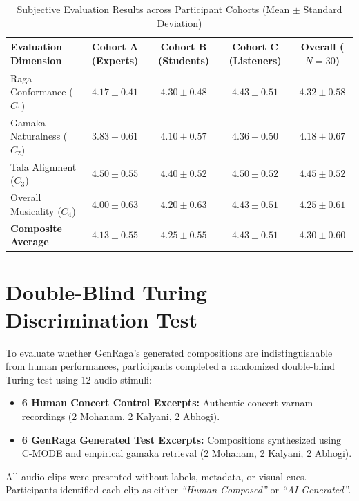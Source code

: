 \documentclass[11pt,a4paper]{article}
\begin{document}
\begin{table}[h!]
\centering
\caption{Subjective Evaluation Results across Participant Cohorts (Mean $\pm$ Standard Deviation)}
\label{tab:likert}
\vspace{0.5em}
\begin{tabular}{lcccc}
\toprule
\textbf{Evaluation Dimension} & \textbf{Cohort A (Experts)} & \textbf{Cohort B (Students)} & \textbf{Cohort C (Listeners)} & \textbf{Overall ($N=30$)} \\
\midrule
Raga Conformance ($C_1$) & $4.17 \pm 0.41$ & $4.30 \pm 0.48$ & $4.43 \pm 0.51$ & $\mathbf{4.32 \pm 0.58}$ \\
Gamaka Naturalness ($C_2$) & $3.83 \pm 0.61$ & $4.10 \pm 0.57$ & $4.36 \pm 0.50$ & $\mathbf{4.18 \pm 0.67}$ \\
Tala Alignment ($C_3$) & $4.50 \pm 0.55$ & $4.40 \pm 0.52$ & $4.50 \pm 0.52$ & $\mathbf{4.45 \pm 0.52}$ \\
Overall Musicality ($C_4$) & $4.00 \pm 0.63$ & $4.20 \pm 0.63$ & $4.43 \pm 0.51$ & $\mathbf{4.25 \pm 0.61}$ \\
\midrule
\textbf{Composite Average} & $\mathbf{4.13 \pm 0.55}$ & $\mathbf{4.25 \pm 0.55}$ & $\mathbf{4.43 \pm 0.51}$ & $\mathbf{4.30 \pm 0.60}$ \\
\bottomrule
\end{tabular}
\end{table}

\section{Double-Blind Turing Discrimination Test}

To evaluate whether GenRaga's generated compositions are indistinguishable from human performances, participants completed a randomized double-blind Turing test using 12 audio stimuli:
\begin{itemize}
    \item \textbf{6 Human Concert Control Excerpts:} Authentic concert varnam recordings (2 Mohanam, 2 Kalyani, 2 Abhogi).
    \item \textbf{6 GenRaga Generated Test Excerpts:} Compositions synthesized using C-MODE and empirical gamaka retrieval (2 Mohanam, 2 Kalyani, 2 Abhogi).
\end{itemize}

All audio clips were presented without labels, metadata, or visual cues. Participants identified each clip as either \textit{``Human Composed''} or \textit{``AI Generated''}.
\end{document}
